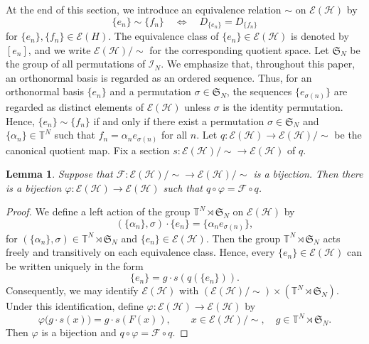 \documentclass[11pt]{amsart}
\newtheorem{lemma}[theorem]{Lemma}
\theoremstyle{remark}
\newcommand{\cH}{{\mathcal{H}}}
\begin{document}
At the end of this section, we introduce an equivalence relation $\sim$ on $\mathcal{E}(\cH)$ by
\[
\{e_n\} \sim \{f_n\} 
\quad\Longleftrightarrow\quad
D_{\{e_n\}}=D_{\{f_n\}}
\]
for $\{e_n\},\{f_n\}\in \mathcal{E}(H)$. The equivalence class of $\{e_n\} \in \mathcal{E}(\cH)$ is denoted by $[e_n]$, and we write $\mathcal{E}(\cH)/ \sim$ for the corresponding quotient space. Let $\mathfrak{S}_N$ be the group of all permutations of  $\mathcal{I}_N$. We emphasize that, throughout this paper, an orthonormal basis is regarded as an ordered sequence. Thus, for an orthonormal basis $\{e_n\}$ and a permutation $\sigma \in \mathfrak{S}_N$, the sequences $\{e_{\sigma(n)}\}$ are regarded as distinct elements of $\mathcal{E}(\mathcal{H})$ unless $\sigma$ is the identity permutation. Hence, $\{e_n\} \sim \{f_n\} $ if and only if there exist a permutation $\sigma\in \mathfrak{S}_N$ and $\{\alpha_n\} \in \mathbb T^{N}$ such that $f_n=\alpha_n e_{\sigma(n)}$ for all $n$.  Let $q:\mathcal{E}(\cH) \to \mathcal{E}(\cH)/ \sim $ be the canonical quotient map. Fix a section $s:\mathcal{E}(\cH)/ \sim  \to \mathcal{E}(\cH)$ of $q$. 
\begin{lemma}\label{lift}
Suppose that $\mathcal{F}:\mathcal{E}(\cH)/ \sim \to \mathcal{E}(\cH)/ \sim$
is a bijection. Then there is a bijection $\varphi:\mathcal{E}(\cH) \to \mathcal{E}(\cH)$ such that $q\circ \varphi=\mathcal{F} \circ q$.
\end{lemma}
\begin{proof}
We define a left action of  the group $\mathbb T^{N}\rtimes \mathfrak{S}_N$ on $\mathcal{E}(\cH)$ by
\[
(\{\alpha_n\}, \sigma)   \cdot\{e_n\}=\{\alpha_n e_{\sigma(n)}\}, 
\]
for $(\{\alpha_n\}, \sigma) \in \mathbb T^{N}\rtimes \mathfrak{S}_N$ and $\{e_n\} \in \mathcal{E}(\cH)$. Then the group $\mathbb T^{N}\rtimes \mathfrak{S}_N$ acts freely and transitively on each equivalence class. Hence, every $\{e_n\} \in \mathcal{E}(\cH)$ can be written uniquely in the form
\[
\{e_n\}=g\cdot s(q(\{e_n\})).
\]
Consequently, we may identify $\mathcal{E}(\cH)$ with $(\mathcal{E}(\cH)/\sim) \times (\mathbb T^{N}\rtimes \mathfrak{S}_N)$.
Under this identification, define $\varphi:\mathcal{E}(\cH) \to  \mathcal{E}(\cH)$
by
\[
\varphi \bigl(g\cdot s(x)\bigr)=g\cdot s(F(x)), \qquad x \in\mathcal{E}(\cH)/\sim, \quad  g\in \mathbb T^{N}\rtimes \mathfrak{S}_N.
\]
Then $\varphi$ is a bijection and $q\circ \varphi=\mathcal{F} \circ q$.  
\end{proof}
\end{document}
